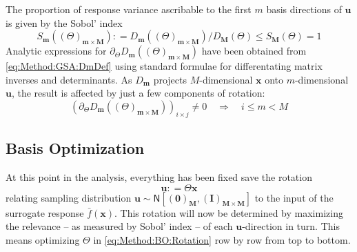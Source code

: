 \documentclass[preprint,12pt]{elsarticle}
\newcommand*{\M}[1]{\ensuremath{#1}\xspace}
\newcommand*{\vr}[1]{\M{\mathbf{#1}}}
\newcommand*{\deq}{\M{\mathrel{\mathop:}=}}
\newcommand*{\gauss}[2]{\mathsf{N}\!\left\lbrack{} #1 , #2 \right\rbrack}
\begin{document}
            The proportion of response variance ascribable to the first $m$ basis directions of $\vr{u}$ is given by the Sobol' index
            \begin{equation} \label{eq:Method:GSA:SDef}
                S_{\vr{m}}((\Theta)_{\vr{m}\times\vr{M}}) \deq D_{\vr{m}}((\Theta)_{\vr{m}\times\vr{M}})/D_{\vr{M}}(\Theta) \leq S_{\vr{M}}(\Theta) = 1
            \end{equation}
            Analytic expressions for $\partial_{\Theta} D_{\vr{m}}((\Theta)_{\vr{m}\times\vr{M}})$ have been obtained from \cref{eq:Method:GSA:DmDef} using standard formulae for differentating matrix inverses and determinants. As $D_{\vr{m}}$ projects $M$-dimensional $\vr{x}$ onto $m$-dimensional $\vr{u}$, the result is affected by just a few components of rotation:
            \begin{equation} \label{eq:Method:GSA:partialD}
                \left(\partial_{\Theta} D_{\vr{m}}((\Theta)_{\vr{m}\times\vr{M}})\right)_{i \times j} \neq 0 \quad \Longrightarrow \quad i \leq m < M
            \end{equation}

        \subsection{Basis Optimization} \label{sub:Method:BO}
            At this point in the analysis, everything has been fixed save the rotation
            \begin{equation} \label{eq:Method:BO:Rotation}
                \vr{u} \deq \Theta \vr{x}
            \end{equation}
            relating sampling distribution $\vr{u} \sim \gauss{(\vr{0})_{\vr{M}}}{(\vr{I})_{\vr{M}\times\vr{M}}}$ to the input of the surrogate response $\bar{f}(\vr{x})$. This rotation will now be determined by maximizing the relevance -- as measured by Sobol' index -- of each $\vr{u}$-direction in turn. This means optimizing $\Theta$ in \cref{eq:Method:BO:Rotation} row by row from top to bottom. 
            
\end{document}
